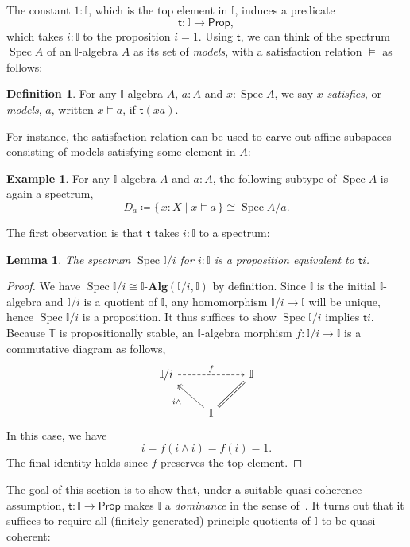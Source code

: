 \documentclass[a4paper,12pt]{amsart}
\newtheorem{lemma}[theorem]{Lemma}
\theoremstyle{definition}
\newtheorem{example}[theorem]{Example}
\newtheorem{definition}[theorem]{Definition}
\newcommand{\mb}[1]{\mathbf{#1}}
\newcommand{\mbb}[1]{\mathbb{#1}}
\newcommand{\T}{\mbb T}
\newcommand{\I}{\mbb I}
\newcommand{\ms}[1]{\mathsf{#1}}
\newcommand{\alg}{\text{-}\mb{Alg}}
\newcommand{\scomp}[2]{\{\,#1\mid#2\,\}}
\newcommand{\pp}{\ms{Prop}}
\newcommand{\spec}{\operatorname{Spec}}
\begin{document}
The constant $1 : \I$, which is the top element in $\I$, induces a predicate
\[ \ms t \colon \I \to \pp, \]
which takes $i : \I$ to the proposition $i = 1$. Using $\ms t$, we can think of the spectrum $\spec A$ of an $\I$-algebra $A$ as its set of \emph{models}, with a satisfaction relation $\models$ as follows:

\begin{definition}
  For any $\I$-algebra $A$, $a:A$ and $x:\spec A$, we say $x$ \emph{satisfies}, or \emph{models}, $a$, written $x \models a$, if $\ms t(xa)$.
\end{definition}

For instance, the satisfaction relation can be used to carve out affine subspaces consisting of models satisfying some element in $A$:

\begin{example}
  For any $\I$-algebra $A$ and $a:A$, the following subtype of $\spec A$ is again a spectrum,
  \[ D_a \coloneq \scomp{x : X}{x \models a} \cong \spec A/a. \]
\end{example}

The first observation is that $\ms t$ takes $i : \I$ to a spectrum:

\begin{lemma}\label{lem:openpropaffine}
  The spectrum $\spec\I/i$ for $i:\I$ is a proposition equivalent to $\ms ti$.
\end{lemma}
\begin{proof}
  We have $\spec \I/i \cong \I\alg(\I/i,\I)$ by definition. Since $\I$ is the initial $\I$-algebra and $\I/i$ is a quotient of $\I$, any homomorphism $\I/i \to \I$ will be unique, hence $\spec\I/i$ is a proposition. It thus suffices to show $\spec\I/i$ implies $\ms ti$. Because $\T$ is propositionally stable, an $\I$-algebra morphism $f \colon \I/i \to \I$ is a commutative diagram as follows,
  \[
  \begin{tikzcd}
    \I/i \ar[rr, dashed, "f"] & & \I \\ 
    & \I \ar[ul, two heads, "i \wedge -"] \ar[ur, equal]
  \end{tikzcd}
  \]
  In this case, we have
  \[ i = f(i \wedge i) = f(i) = 1. \]
  The final identity holds since $f$ preserves the top element. 
\end{proof}

The goal of this section is to show that, under a suitable quasi-coherence assumption, $\ms t \colon \I \to \pp$ makes $\I$ a \emph{dominance} in the sense of~\cite{rosolini1986continuity}. It turns out that it suffices to require all (finitely generated) principle quotients of $\I$ to be quasi-coherent:
\end{document}

